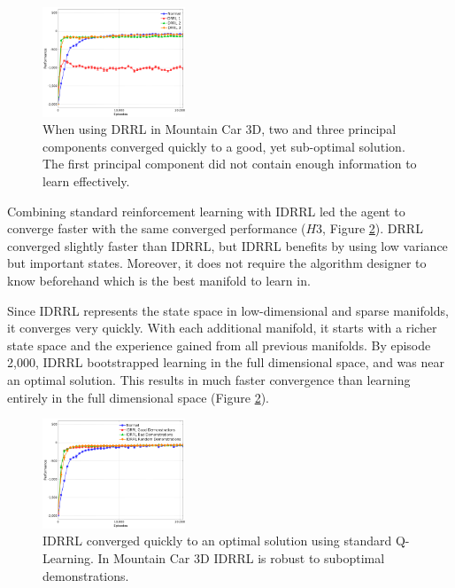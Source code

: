 \documentclass[10pt,a4paper]{article}
\begin{document}
\begin{figure}[h!]
  \centering
      \includegraphics[width=0.38\textwidth]{DRRL_3DMountainCar}
  \caption{When using DRRL in Mountain Car 3D, two and three principal components converged quickly to a good, yet sub-optimal solution. The first principal component did not contain enough information to learn effectively.}
  \label{fig:DRRL_3DMountainCar}
\end{figure}

Combining standard reinforcement learning with IDRRL led the agent to converge faster with the same converged performance ($H3$, Figure \ref{fig:IDRRL_3DMountainCar}). DRRL converged slightly faster than IDRRL, but IDRRL benefits by using low variance but important states. Moreover, it does not require the algorithm designer to know beforehand which is the best manifold to learn in. 

Since IDRRL represents the state space in low-dimensional and sparse manifolds, it converges very quickly. With each additional manifold, it starts with a richer state space and the experience gained from all previous manifolds. By episode 2,000, IDRRL bootstrapped learning in the full dimensional space, and was near an optimal solution. This results in much faster convergence than learning entirely in the full dimensional space (Figure \ref{fig:IDRRL_3DMountainCar}).


\begin{figure}[h!]
  \centering
      \includegraphics[width=0.38\textwidth]{IDRRL_3DMountainCar}
  \caption{IDRRL converged quickly to an optimal solution using standard Q-Learning. In Mountain Car 3D IDRRL is robust to suboptimal demonstrations.}
  \label{fig:IDRRL_3DMountainCar}
\end{figure}
\end{document}
